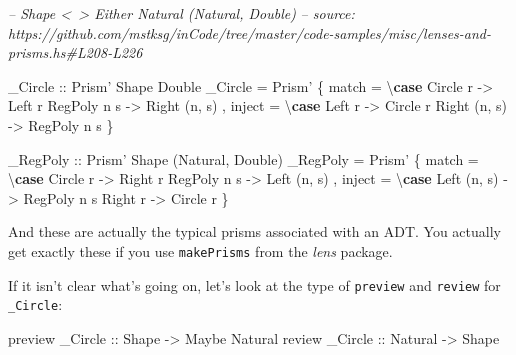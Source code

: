 \documentclass[]{article}
\newenvironment{Shaded}{}{}
\newcommand{\CommentTok}[1]{\textcolor[rgb]{0.38,0.63,0.69}{\textit{#1}}}
\newcommand{\DataTypeTok}[1]{\textcolor[rgb]{0.56,0.13,0.00}{#1}}
\newcommand{\FunctionTok}[1]{\textcolor[rgb]{0.02,0.16,0.49}{#1}}
\newcommand{\KeywordTok}[1]{\textcolor[rgb]{0.00,0.44,0.13}{\textbf{#1}}}
\newcommand{\NormalTok}[1]{#1}
\newcommand{\OtherTok}[1]{\textcolor[rgb]{0.00,0.44,0.13}{#1}}
\begin{document}
\begin{Shaded}
\begin{Highlighting}[]
\CommentTok{-- Shape <~> Either Natural (Natural, Double)}
\CommentTok{-- source: https://github.com/mstksg/inCode/tree/master/code-samples/misc/lenses-and-prisms.hs#L208-L226}

\OtherTok{_Circle ::} \DataTypeTok{Prism'} \DataTypeTok{Shape} \DataTypeTok{Double}
\NormalTok{_Circle }\FunctionTok{=} \DataTypeTok{Prism'}
\NormalTok{    \{ match  }\FunctionTok{=}\NormalTok{ \textbackslash{}}\KeywordTok{case}
        \DataTypeTok{Circle}\NormalTok{  r    }\OtherTok{->} \DataTypeTok{Left}\NormalTok{ r}
        \DataTypeTok{RegPoly}\NormalTok{ n s  }\OtherTok{->} \DataTypeTok{Right}\NormalTok{ (n, s)}
\NormalTok{    , inject }\FunctionTok{=}\NormalTok{ \textbackslash{}}\KeywordTok{case}
        \DataTypeTok{Left}\NormalTok{   r     }\OtherTok{->} \DataTypeTok{Circle}\NormalTok{ r}
        \DataTypeTok{Right}\NormalTok{ (n, s) }\OtherTok{->} \DataTypeTok{RegPoly}\NormalTok{ n s}
\NormalTok{    \}}

\OtherTok{_RegPoly ::} \DataTypeTok{Prism'} \DataTypeTok{Shape}\NormalTok{ (}\DataTypeTok{Natural}\NormalTok{, }\DataTypeTok{Double}\NormalTok{)}
\NormalTok{_RegPoly }\FunctionTok{=} \DataTypeTok{Prism'}
\NormalTok{    \{ match  }\FunctionTok{=}\NormalTok{ \textbackslash{}}\KeywordTok{case}
        \DataTypeTok{Circle}\NormalTok{  r    }\OtherTok{->} \DataTypeTok{Right}\NormalTok{ r}
        \DataTypeTok{RegPoly}\NormalTok{ n s  }\OtherTok{->} \DataTypeTok{Left}\NormalTok{ (n, s)}
\NormalTok{    , inject }\FunctionTok{=}\NormalTok{ \textbackslash{}}\KeywordTok{case}
        \DataTypeTok{Left}\NormalTok{  (n, s) }\OtherTok{->} \DataTypeTok{RegPoly}\NormalTok{ n s}
        \DataTypeTok{Right}\NormalTok{  r     }\OtherTok{->} \DataTypeTok{Circle}\NormalTok{ r}
\NormalTok{    \}}
\end{Highlighting}
\end{Shaded}

And these are actually the typical prisms associated with an ADT. You actually
get exactly these if you use \texttt{makePrisms} from the \emph{lens} package.

If it isn't clear what's going on, let's look at the type of \texttt{preview}
and \texttt{review} for \texttt{\_Circle}:

\begin{Shaded}
\begin{Highlighting}[]
\NormalTok{preview}\OtherTok{ _Circle ::} \DataTypeTok{Shape}   \OtherTok{->} \DataTypeTok{Maybe} \DataTypeTok{Natural}
\NormalTok{review}\OtherTok{  _Circle ::} \DataTypeTok{Natural} \OtherTok{->} \DataTypeTok{Shape}
\end{Highlighting}
\end{Shaded}
\end{document}
